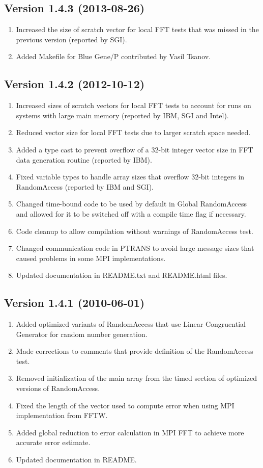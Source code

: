 \documentclass[twocolumn]{article}
\begin{document}
\subsection{Version 1.4.3 (2013-08-26)}
\begin{enumerate}
\item Increased the size of scratch vector for local FFT tests that was
missed in the previous version (reported by SGI).
\item Added Makefile for Blue Gene/P contributed by Vasil Tsanov.
\end{enumerate}

\subsection{Version 1.4.2 (2012-10-12)}
\begin{enumerate}
\item Increased sizes of scratch vectors for local FFT tests to account for
runs on systems with large main memory (reported by IBM, SGI and Intel).
\item Reduced vector size for local FFT tests due to larger scratch space needed.
\item Added a type cast to prevent overflow of a 32-bit integer vector
  size in FFT data generation routine (reported by IBM).
\item Fixed variable types to handle array sizes that overflow 32-bit
  integers in RandomAccess (reported by IBM and SGI).
\item Changed time-bound code to be used by default in Global RandomAccess and
allowed for it to be switched off with a compile time flag if necessary.
\item Code cleanup to allow compilation without warnings of RandomAccess test.
\item Changed communication code in PTRANS to avoid large message sizes that
caused problems in some MPI implementations.
\item Updated documentation in README.txt and README.html files.
\end{enumerate}

\subsection{Version 1.4.1 (2010-06-01)}
\begin{enumerate}
\item Added optimized variants of RandomAccess that use Linear Congruential Generator for random number generation.
\item Made corrections to comments that provide definition of the RandomAccess test.
\item Removed initialization of the main array from the timed section of optimized versions of RandomAccess.
\item Fixed the length of the vector used to compute error when using MPI implementation from FFTW.
\item Added global reduction to error calculation in MPI FFT to achieve more accurate error estimate.
\item Updated documentation in README.
\end{enumerate}
\end{document}
